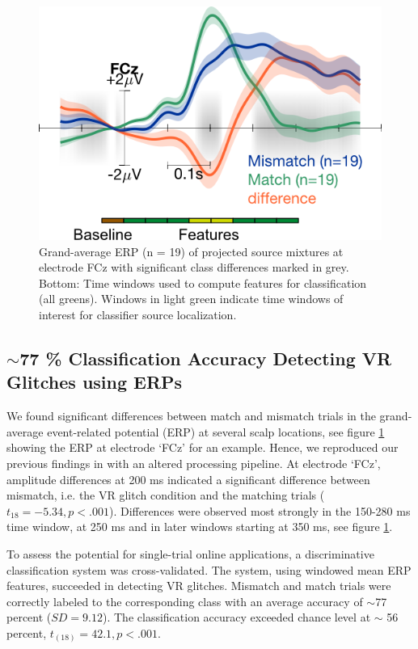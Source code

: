 
\begin{figure}[h]
  \includegraphics[width=.7\textwidth]{figures/erp_FCZ_diff_delay.png}
  \caption{Grand-average ERP (n = 19) of projected source mixtures at electrode FCz with significant class differences marked in grey. Bottom: Time windows used to compute features for classification (all greens). Windows in light green indicate time windows of interest for classifier source localization.}
  \label{erp}
\end{figure}

\subsection{$\sim$77 \% Classification Accuracy Detecting VR Glitches using ERPs}

We found significant differences between match and mismatch trials in the grand-average event-related potential (ERP) at several scalp locations, see figure \ref{erp} showing the ERP at electrode `FCz' for an example. Hence, we reproduced our previous findings in \cite{Gehrke2019-og} with an altered processing pipeline. At electrode `FCz', amplitude differences at 200 ms indicated a significant difference between mismatch, i.e. the VR glitch condition and the matching trials ($t_{18} = -5.34, p < .001$). Differences were observed most strongly in the 150-280 ms time window, at 250 ms and in later windows starting at 350 ms, see figure \ref{erp}.

To assess the potential for single-trial online applications, a discriminative classification system was cross-validated. The system, using windowed mean ERP features, succeeded in detecting VR glitches. Mismatch and match trials were correctly labeled to the corresponding class with an average accuracy of $\sim$77 percent ($SD = 9.12$). The classification accuracy exceeded chance level at $\sim$ 56 percent, $t_{(18)} = 42.1, p < .001$. 

